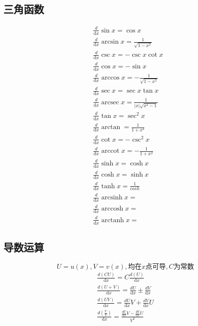 \subsection{三角函数}
\begin{align}
&\frac{d}{\mathrm{d}{x}}\sin x = \cos x \label{derivative_sin}\\
&\frac{d}{\mathrm{d}{x}}\arcsin x = \frac{1}{\sqrt{1-x^2}} \label{derivative_arcsin}\\
&\frac{d}{\mathrm{d}{x}}\csc x = -\csc x\cot x \label{derivative_csc}\\
&\frac{d}{\mathrm{d}{x}}\cos x = -\sin x \label{derivative_cos}\\
&\frac{d}{\mathrm{d}{x}}\arccos x = -\frac{1}{\sqrt{1-x^2}} \label{derivative_arccos}\\
&\frac{d}{\mathrm{d}{x}}\sec x = \sec x\tan x \label{derivative_sec}\\
&\frac{d}{\mathrm{d}{x}}\operatorname{arcsec}{x}=\frac{1}{\left|x\right|\sqrt{x^2-1}} \label{derivative_arcsec}\\
&\frac{d}{\mathrm{d}{x}}\tan x = \sec^2x \label{derivative_tan}\\
&\frac{d}{\mathrm{d}{x}}\arctan = \frac{1}{1+x^2} \label{derivative_arctan}\\
&\frac{d}{\mathrm{d}{x}}\cot x = -\csc^2x \label{derivative_cot}\\
&\frac{d}{\mathrm{d}{x}}\operatorname{arccot}{x} = -\frac{1}{1+x^2}\label{derivative_arccot}\\
&\frac{d}{\mathrm{d}{x}}\sinh x = \cosh x \label{derivative_sinh}\\
&\frac{d}{\mathrm{d}{x}}\cosh x = \sinh x \label{derivative_cosh}\\
&\frac{d}{\mathrm{d}{x}}\tanh x = \frac{1}{cosh} \label{derivative_tanh}\\
&\frac{d}{\mathrm{d}{x}}\operatorname{arcsinh}{x} =  \label{derivative_arcsinh}\\
&\frac{d}{\mathrm{d}{x}}\operatorname{arccosh}{x} = \label{derivative_arccosh}\\
&\frac{d}{\mathrm{d}{x}}\operatorname{arctanh}{x} = \label{derivative_arctanh}
\end{align}

\subsection{导数运算}
$$U=u(x),V=v(x),\mbox{均在}x\mbox{点可导},C\mbox{为常数}$$
\begin{align}
  \frac{d(CU)}{\mathrm{d}{x}}= C\frac{d(U)}{\mathrm{d}{x}}\label{limit_operation_1}\\
  \frac{d(U+V)}{\mathrm{d}{x}}=\frac{dU}{\mathrm{d}{x}}\pm \frac{dV}{\mathrm{d}{x}}\label{limit_operation_2}\\
  \frac{d(UV)}{\mathrm{d}{x}}=\frac{dU}{\mathrm{d}{x}}V+\frac{dV}{\mathrm{d}{x}}U\label{limit_operation_3}\\
  \frac{d(\frac{U}{V})}{\mathrm{d}{x}}=\frac{\frac{dU}{\mathrm{d}{x}}V-\frac{dV}{\mathrm{d}{x}}U}{V^2}\label{limit_operation_4}
\end{align}
